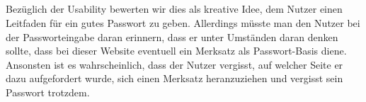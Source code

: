 \subsection{}
Bezüglich der Usability bewerten wir dies als kreative Idee, dem Nutzer einen Leitfaden für ein gutes Passwort zu geben. Allerdings müsste man den Nutzer bei der Passworteingabe daran erinnern, dass er unter Umständen daran denken sollte, dass bei dieser Website eventuell ein Merksatz als Passwort-Basis diene. Ansonsten ist es wahrscheinlich, dass der Nutzer vergisst, auf welcher Seite er dazu aufgefordert wurde, sich einen Merksatz heranzuziehen und vergisst sein Passwort trotzdem.

